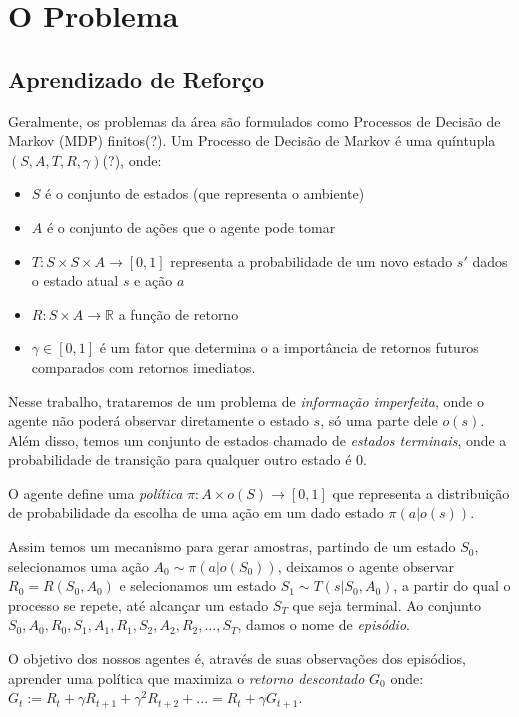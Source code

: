 \chapter{O Problema}
\label{cap:descricao}

\section{Aprendizado de Reforço}

Geralmente, os problemas da área são formulados como Processos de Decisão de Markov (MDP) finitos(?).
Um Processo de Decisão de Markov é uma quíntupla $(S,A,T,R,\gamma)$(?), onde:
\begin{itemize}
    \item $S$ é o conjunto de estados (que representa o ambiente)
    \item $A$ é o conjunto de ações que o agente pode tomar
    \item $T: S \times S \times A \to [0, 1]$ representa a probabilidade de um novo estado $s'$ dados o estado atual $s$ e ação $a$
    \item $R: S \times A \to \mathbb{R}$ a função de retorno
    \item $\gamma \in [0, 1]$ é um fator que determina o a importância de retornos futuros comparados com retornos imediatos.   
\end{itemize}

Nesse trabalho, trataremos de um problema de \textit{informação imperfeita},
onde o agente não poderá observar diretamente o estado $s$,
só uma parte dele $o(s)$. 
Além disso, temos um conjunto de estados chamado de \textit{estados terminais},
onde a probabilidade de transição para qualquer outro estado é 0.

O agente define uma \textit{política} $\pi: A \times o(S) \to [0, 1]$ 
que representa a distribuição de probabilidade da escolha de uma ação em um dado estado $\pi(a | o(s))$.

Assim temos um mecanismo para gerar amostras, 
partindo de um estado $S_0$,
selecionamos uma ação $A_0 \sim \pi(a | o(S_0))$,
deixamos o agente observar $R_0 = R(S_0, A_0)$
e selecionamos um estado $S_1 \sim T(s | S_0, A_0)$,
a partir do qual o processo se repete,
até alcançar um estado $S_T$ que seja terminal.
Ao conjunto 
$S_0, A_0, R_0, S_1, A_1, R_1, S_2, A_2, R_2, ..., S_T$,
damos o nome de \textit{episódio}.

O objetivo dos nossos agentes é, 
através de suas observações dos episódios, 
aprender uma política que maximiza o \textit{retorno descontado} $G_0$ onde:
$G_t := R_t + \gamma R_{t + 1} + \gamma^2R_{t + 2} + ... = R_t + \gamma G_{t + 1}$.

